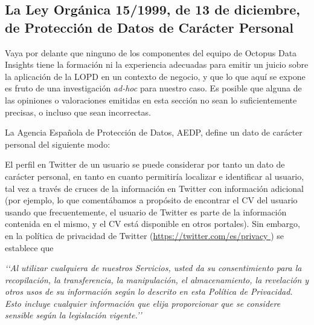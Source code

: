 \subsection{La Ley Orgánica 15/1999, de 13 de diciembre, de Protección de Datos
de Carácter Personal}
\label{subsection:LOPD}

Vaya por delante que ninguno de los componentes del equipo de Octopus Data Insights 
tiene la formación ni la experiencia adecuadas para emitir un juicio sobre la aplicación
de la LOPD en un contexto de negocio, 
y que lo que aquí se expone es fruto de una investigación {\em ad-hoc}
para nuestro caso. Es posible que alguna de las opiniones o valoraciones emitidas en esta
sección no sean lo suficientemente precisas, o incluso que sean  incorrectas.

La Agencia Española de Protección de Datos, AEDP, define un dato de carácter personal del siguiente modo:


El perfil en Twitter de un usuario se puede considerar por tanto un dato de carácter personal, en tanto en cuanto
permitiría localizar e identificar al usuario, tal vez a través de cruces de la información en Twitter con
información adicional (por ejemplo, lo que comentábamos a propósito de encontrar el CV del usuario usando que
frecuentemente, el usuario de Twitter es parte de la información contenida en el mismo, y el CV está disponible en otros 
portales). Sin embargo, en la política de privacidad de Twitter (\url{https://twitter.com/es/privacy })
se establece que

\leftskip=1cm
\rightskip=1cm
{\em \lq\lq Al utilizar cualquiera de nuestros Servicios, usted da su consentimiento para la recopilación, 
 la transferencia, la manipulación, el almacenamiento, la revelación y otros usos de su información 
 según lo descrito en esta Política de Privacidad. Esto incluye cualquier información que elija proporcionar que 
 se considere sensible según la legislación vigente.\rq\rq}

\leftskip=0pt\rightskip=0pt





